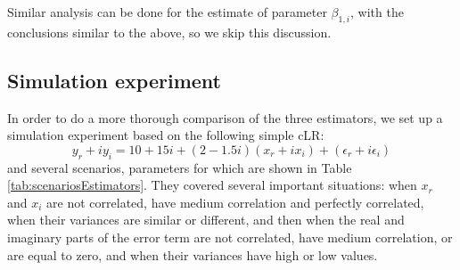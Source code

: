 \documentclass[
]{book}
\begin{document}
Similar analysis can be done for the estimate of parameter \(\beta_{1,i}\), with the conclusions similar to the above, so we skip this discussion.

\hypertarget{EstimatesSimulation}{%
\subsection{Simulation experiment}\label{EstimatesSimulation}}

In order to do a more thorough comparison of the three estimators, we set up a simulation experiment based on the following simple cLR:
\begin{equation*}
    y_r + i y_i = 10+15i + (2-1.5i) (x_r + i x_i) + (\epsilon_r + i \epsilon_i)
\end{equation*}
and several scenarios, parameters for which are shown in Table \ref{tab:scenariosEstimators}. They covered several important situations: when \(x_r\) and \(x_i\) are not correlated, have medium correlation and perfectly correlated, when their variances are similar or different, and then when the real and imaginary parts of the error term are not correlated, have medium correlation, or are equal to zero, and when their variances have high or low values.

\begin{table}
\centering
\caption{\label{tab:scenariosEstimators}Several scenarios for the comparison of estimators.}
\centering
{}
\end{table}
\end{document}
